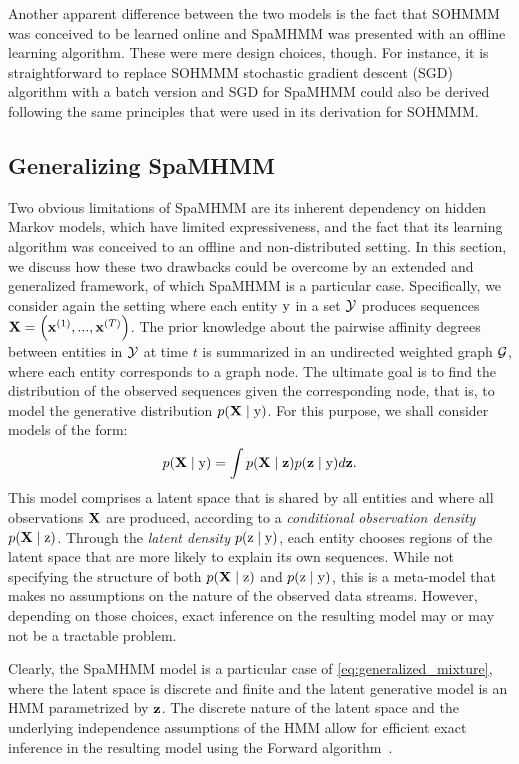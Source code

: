 Another apparent difference between the two models is the fact that SOHMMM was conceived to be learned online and SpaMHMM was presented with an offline learning algorithm. These were mere design choices, though. For instance, it is straightforward to replace SOHMMM stochastic gradient descent (SGD) algorithm with a batch version and SGD for SpaMHMM could also be derived following the same principles that were used in its derivation for SOHMMM.

\subsection{Generalizing SpaMHMM}

Two obvious limitations of SpaMHMM are its inherent dependency on hidden Markov models, which have limited expressiveness, and the fact that its learning algorithm was conceived to an offline and non-distributed setting. In this section, we discuss how these two drawbacks could be overcome by an extended and generalized framework, of which SpaMHMM is a particular case. Specifically, we consider again the setting where each entity ${\textnormal{y}}$ in a set ${\mathcal{Y}}$ produces sequences ${\mathbf{X}} = \left({\mathbf{x}}^{(1)}, ...,{\mathbf{x}}^{(T)} \right)$. The prior knowledge about the pairwise affinity degrees between entities in ${\mathcal{Y}}$ at time $t$ is summarized in an undirected weighted graph ${\mathcal{G}}$, where each entity corresponds to a graph node. The ultimate goal is to find the distribution of the observed sequences given the corresponding node, that is, to model the generative distribution $p({\mathbf{X}} \mid {\textnormal{y}})$. For this purpose, we shall consider models of the form:
\begin{equation}
\label{eq:generalized_mixture}
p({\mathbf{X}} \mid {\textnormal{y}}) = \int p({\mathbf{X}} \mid {\mathbf{z}}) p({\mathbf{z}} \mid {\textnormal{y}}) d{\mathbf{z}}.
\end{equation}
This model comprises a latent space that is shared by all entities and where all observations ${\mathbf{X}}$ are produced, according to a \textit{conditional observation density} $p({\mathbf{X}} \mid {\textnormal{z}})$. Through the \textit{latent density} $p({\textnormal{z}} \mid {\textnormal{y}})$, each entity chooses regions of the latent space that are more likely to explain its own sequences. While not specifying the structure of both $p({\mathbf{X}} \mid {\textnormal{z}})$ and $p({\textnormal{z}} \mid {\textnormal{y}})$, this is a meta-model that makes no assumptions on the nature of the observed data streams. However, depending on those choices, exact inference on the resulting model may or may not be a tractable problem.

Clearly, the SpaMHMM model is a particular case of \eqref{eq:generalized_mixture}, where the latent space is discrete and finite and the latent generative model is an HMM parametrized by ${\mathbf{z}}$. The discrete nature of the latent space and the underlying independence assumptions of the HMM allow for efficient exact inference in the resulting model using the Forward algorithm~\cite{Rabiner1986}.

